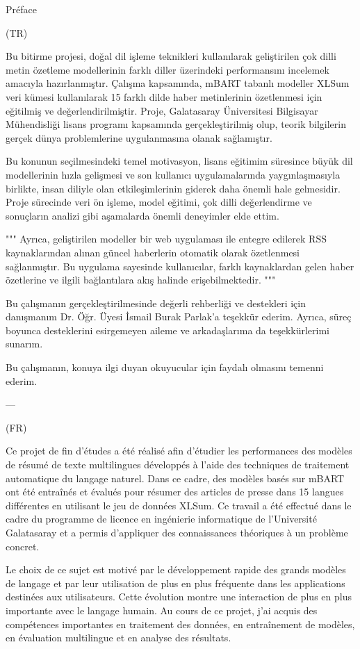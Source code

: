 Préface

(TR)

Bu bitirme projesi, doğal dil işleme teknikleri kullanılarak geliştirilen çok dilli metin özetleme modellerinin farklı diller üzerindeki performansını incelemek amacıyla hazırlanmıştır. Çalışma kapsamında, mBART tabanlı modeller XLSum veri kümesi kullanılarak 15 farklı dilde haber metinlerinin özetlenmesi için eğitilmiş ve değerlendirilmiştir. Proje, Galatasaray Üniversitesi Bilgisayar Mühendisliği lisans programı kapsamında gerçekleştirilmiş olup, teorik bilgilerin gerçek dünya problemlerine uygulanmasına olanak sağlamıştır.

Bu konunun seçilmesindeki temel motivasyon, lisans eğitimim süresince büyük dil modellerinin hızla gelişmesi ve son kullanıcı uygulamalarında yaygınlaşmasıyla birlikte, insan diliyle olan etkileşimlerinin giderek daha önemli hale gelmesidir. Proje sürecinde veri ön işleme, model eğitimi, çok dilli değerlendirme ve sonuçların analizi gibi aşamalarda önemli deneyimler elde ettim.

""" Ayrıca, geliştirilen modeller bir web uygulaması ile entegre edilerek RSS kaynaklarından alınan güncel haberlerin otomatik olarak özetlenmesi sağlanmıştır. Bu uygulama sayesinde kullanıcılar, farklı kaynaklardan gelen haber özetlerine ve ilgili bağlantılara akış halinde erişebilmektedir. """

Bu çalışmanın gerçekleştirilmesinde değerli rehberliği ve destekleri için danışmanım Dr. Öğr. Üyesi İsmail Burak Parlak’a teşekkür ederim. Ayrıca, süreç boyunca desteklerini esirgemeyen aileme ve arkadaşlarıma da teşekkürlerimi sunarım.

Bu çalışmanın, konuya ilgi duyan okuyucular için faydalı olmasını temenni ederim.

---

(FR)

Ce projet de fin d’études a été réalisé afin d’étudier les performances des modèles de résumé de texte multilingues développés à l’aide des techniques de traitement automatique du langage naturel. Dans ce cadre, des modèles basés sur mBART ont été entraînés et évalués pour résumer des articles de presse dans 15 langues différentes en utilisant le jeu de données XLSum. Ce travail a été effectué dans le cadre du programme de licence en ingénierie informatique de l’Université Galatasaray et a permis d’appliquer des connaissances théoriques à un problème concret.

Le choix de ce sujet est motivé par le développement rapide des grands modèles de langage et par leur utilisation de plus en plus fréquente dans les applications destinées aux utilisateurs. Cette évolution montre une interaction de plus en plus importante avec le langage humain. Au cours de ce projet, j’ai acquis des compétences importantes en traitement des données, en entraînement de modèles, en évaluation multilingue et en analyse des résultats.

